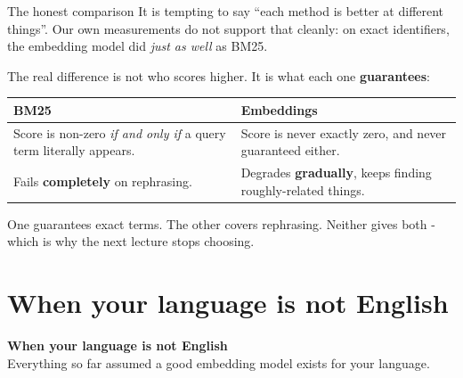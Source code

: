 \documentclass[aspectratio=169]{beamer}
\newcommand{\takebox}[1]{%
  \begin{tcolorbox}[colback=paramgreen!8, colframe=paramgreen, boxrule=0.6pt, arc=2pt]
  #1
  \end{tcolorbox}}
\newcommand{\sectiontransition}[2]{%
  \begin{frame}[plain]
    \vfill
    \begin{center}
      {\Huge\bfseries\color{popblue} #1}\\[1.1em]
      {\large #2}
    \end{center}
    \vfill
  \end{frame}}
\begin{document}
\begin{frame}{The honest comparison}
  \vspace{0.2em}
  It is tempting to say ``each method is better at different things''. Our own measurements
  do not support that cleanly: on exact identifiers, the embedding model did \emph{just as
  well} as BM25.

  \vspace{0.5em}
  The real difference is not who scores higher. It is what each one \textbf{guarantees}:

  \vspace{0.3em}
  \begin{center}
  \small
  \begin{tabular}{>{\raggedright\arraybackslash}p{}>{\raggedright\arraybackslash}p{}}
    \toprule
    \textbf{BM25} & \textbf{Embeddings} \\
    \midrule
    Score is non-zero \emph{if and only if} a query term literally appears.
    &
    Score is never exactly zero, and never guaranteed either. \\[0.5em]
    Fails \textbf{completely} on rephrasing.
    &
    Degrades \textbf{gradually}, keeps finding roughly-related things. \\
    \bottomrule
  \end{tabular}
  \end{center}

  \vspace{0.5em}
  \takebox{One guarantees exact terms. The other covers rephrasing. Neither gives both -
  which is why the next lecture stops choosing.}
\end{frame}

\section{When your language is not English}
\sectiontransition{When your language is not English}{Everything so far assumed a good
embedding model exists for your language.}
\end{document}
